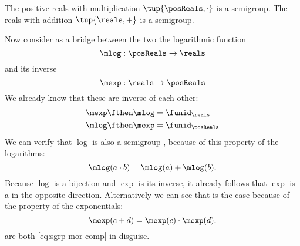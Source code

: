 \begin{example}
    The positive reals with multiplication  $\tup{\posReals, \cdot}$ is a semigroup.
    The reals with addition $\tup{\reals, +}$ is a semigroup.

    Now consider as a bridge between the two the logarithmic function
    \begin{equation} \label{eq:log}
        \mlog :  \posReals \to \reals
    \end{equation}
    and its inverse
    \begin{equation}\label{eq:exp}
        \mexp :  \reals \to \posReals
    \end{equation}
    We already know that these are inverse of each other:
    \begin{equation}
    \begin{aligned}
        \mexp \fthen \mlog &= \funid_{\reals} \\
        \mlog \fthen \mexp &= \funid_{\posReals}
        \end{aligned}
    \end{equation}
    We can verify that $\log$ is also a semigroup \whomo, because of this property of the logarithms:
    \begin{equation} \label{eq:log-property}
        \mlog(a \cdot b) = \mlog(a) + \mlog(b).
    \end{equation}
    Because $\log$ is a bijection and $\exp$ is its inverse, it already follows that $\exp$ is
    a \whomo in the opposite direction. Alternatively we can see that is the case because of the property of the exponentials:
    \begin{equation} \label{eq:exp-property}
        \mexp(c + d) = \mexp(c) \cdot \mexp(d).
    \end{equation}
     are both \cref{eq:sgrp-mor-comp} in disguise.
\end{example}

